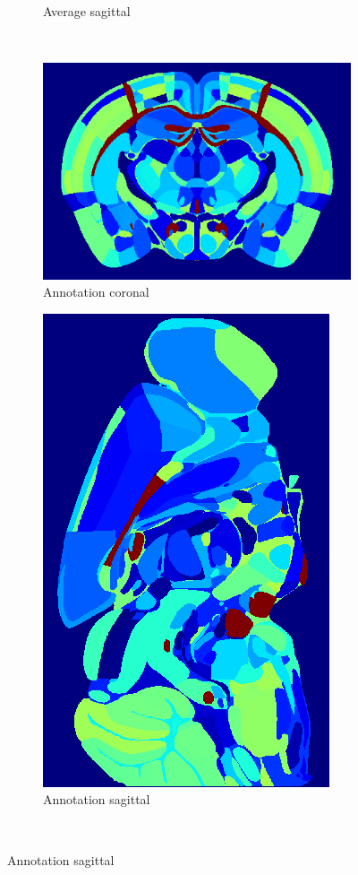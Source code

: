 \documentclass[]{article}
\begin{document}
\begin{figure}
\begin{subfigure}{.3\textwidth}
		\caption{Average sagittal}
		\label{fig:average_sag}
	\end{subfigure}\\
	\begin{subfigure}{.43\textwidth}
		\centering
		\includegraphics[width=.9\linewidth]{figures/ano_coronal.png}
		\caption{Annotation coronal}
		\label{fig:ano_cor}
	\end{subfigure}	
	\begin{subfigure}{.3\textwidth}
		\centering
		\includegraphics[width=.9\linewidth, angle=270]{figures/ano_sagittal.png}
		\caption{Annotation sagittal}
		\label{fig:ano_sag}
	\end{subfigure}\\


\end{figure}
\end{document}
